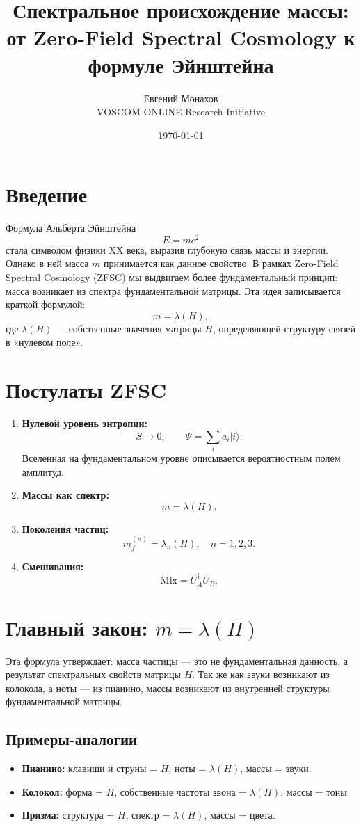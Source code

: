 \documentclass[12pt,a4paper]{article}
\title{Спектральное происхождение массы: \\ 
от Zero-Field Spectral Cosmology к формуле Эйнштейна}
\author{Евгений Монахов \\ VOSCOM ONLINE Research Initiative}
\date{\today}
\begin{document}
\maketitle

\section*{Введение}
Формула Альберта Эйнштейна 
\[
E = mc^2
\]
стала символом физики XX века, выразив глубокую связь массы и энергии. 
Однако в ней масса $m$ принимается как данное свойство. 
В рамках Zero-Field Spectral Cosmology (ZFSC) мы выдвигаем 
более фундаментальный принцип: масса возникает из спектра фундаментальной матрицы. 
Эта идея записывается краткой формулой:
\[
m = \lambda(H),
\]
где $\lambda(H)$ — собственные значения матрицы $H$, определяющей структуру связей в «нулевом поле».

\section*{Постулаты ZFSC}
\begin{enumerate}
  \item \textbf{Нулевой уровень энтропии:}
  \[
  S \to 0, \qquad 
  \Psi = \sum_i a_i |i\rangle .
  \]
  Вселенная на фундаментальном уровне описывается вероятностным полем амплитуд.
  
  \item \textbf{Массы как спектр:}
  \[
  m = \lambda(H).
  \]

  \item \textbf{Поколения частиц:}
  \[
  m^{(n)}_f = \lambda_n(H), \quad n=1,2,3.
  \]

  \item \textbf{Смешивания:}
  \[
  \mathrm{Mix} = U_A^\dagger U_B.
  \]
\end{enumerate}

\section*{Главный закон: $m = \lambda(H)$}
Эта формула утверждает: масса частицы — это не фундаментальная данность, 
а результат спектральных свойств матрицы $H$. 
Так же как звуки возникают из колокола, а ноты — из пианино, 
массы возникают из внутренней структуры фундаментальной матрицы.

\subsection*{Примеры-аналогии}
\begin{itemize}
  \item  \textbf{Пианино:} клавиши и струны = $H$, ноты = $\lambda(H)$, массы = звуки.
  \item  \textbf{Колокол:} форма = $H$, собственные частоты звона = $\lambda(H)$, массы = тоны.
  \item  \textbf{Призма:} структура = $H$, спектр = $\lambda(H)$, массы = цвета.
\end{itemize}
\end{document}
